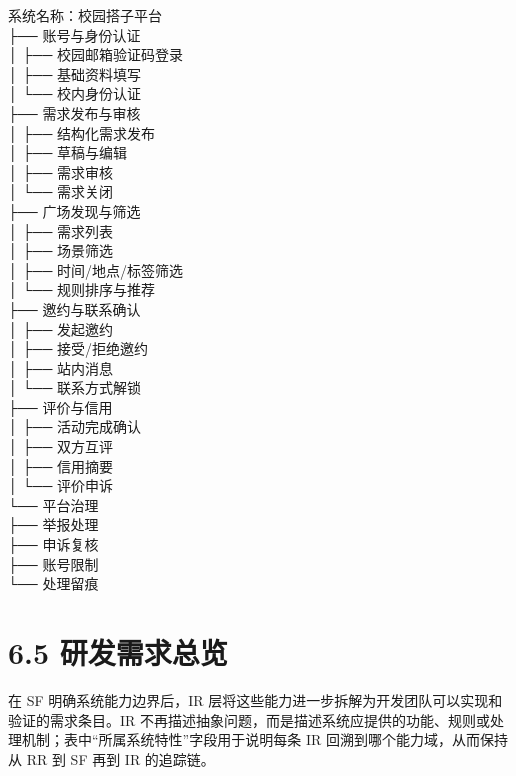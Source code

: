 系统名称：校园搭子平台\\
├── 账号与身份认证\\
│ ├── 校园邮箱验证码登录\\
│ ├── 基础资料填写\\
│ └── 校内身份认证\\
├── 需求发布与审核\\
│ ├── 结构化需求发布\\
│ ├── 草稿与编辑\\
│ ├── 需求审核\\
│ └── 需求关闭\\
├── 广场发现与筛选\\
│ ├── 需求列表\\
│ ├── 场景筛选\\
│ ├── 时间/地点/标签筛选\\
│ └── 规则排序与推荐\\
├── 邀约与联系确认\\
│ ├── 发起邀约\\
│ ├── 接受/拒绝邀约\\
│ ├── 站内消息\\
│ └── 联系方式解锁\\
├── 评价与信用\\
│ ├── 活动完成确认\\
│ ├── 双方互评\\
│ ├── 信用摘要\\
│ └── 评价申诉\\
└── 平台治理\\
├── 举报处理\\
├── 申诉复核\\
├── 账号限制\\
└── 处理留痕

\section{6.5
研发需求总览}\label{ux7814ux53d1ux9700ux6c42ux603bux89c8}

在 SF 明确系统能力边界后，IR 层将这些能力进一步拆解为开发团队可以实现和验证的需求条目。IR 不再描述抽象问题，而是描述系统应提供的功能、规则或处理机制；表中``所属系统特性''字段用于说明每条 IR 回溯到哪个能力域，从而保持从 RR 到 SF 再到 IR 的追踪链。

